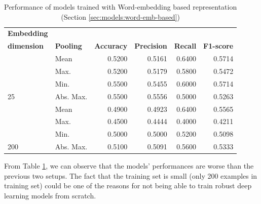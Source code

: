 \begin{table}[htbp]
\centering
\begin{tabular}{llrrrr}
\hline
\multicolumn{1}{l}{\textbf{Embedding}} &  & \multicolumn{1}{l}{} & \multicolumn{1}{l}{} & \multicolumn{1}{l}{} & \multicolumn{1}{l}{} \\
\multicolumn{1}{l}{\textbf{dimension}} & \multirow{-2}{*}{\textbf{Pooling}} & \multicolumn{1}{l}{\multirow{-2}{*}{\textbf{Accuracy}}} & \multicolumn{1}{l}{\multirow{-2}{*}{\textbf{Precision}}} & \multicolumn{1}{l}{\multirow{-2}{*}{\textbf{Recall}}} & \multicolumn{1}{l}{\multirow{-2}{*}{\textbf{F1-score}}} \\ \hline
 & Mean & 0.5200 & 0.5161 & 0.6400 & 0.5714 \\
 & Max. & 0.5200 & 0.5179 & 0.5800 & 0.5472 \\
 & Min. & 0.5500 & 0.5455 & 0.6000 & 0.5714 \\
\multirow{-4}{*}{25} & Abs. Max. & 0.5500 & 0.5556 & 0.5000 & 0.5263 \\ \hline
 & Mean & 0.4900 & 0.4923 & 0.6400 & 0.5565 \\
 & Max. & 0.4500 & 0.4444 & 0.4000 & 0.4211 \\
 & Min. & 0.5000 & 0.5000 & 0.5200 & 0.5098 \\
\multirow{-4}{*}{200} & Abs. Max. & 0.5100 & 0.5091 & 0.5600 & 0.5333 \\ \hline
\end{tabular}
\caption{Performance of models trained with Word-embedding based representation (Section \ref{sec:models:word-emb-based})}
\label{tab:results:performance-word-emb-based}
\end{table}


From Table \ref{tab:results:performance-word-emb-based}, we can observe that the models' performances are worse than the previous two setups. The fact that the training set is small (only 200 examples in training set) could be one of the reasons for not being able to train robust deep learning models from scratch.

